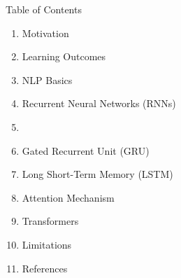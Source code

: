 \begin{frame}[allowframebreaks]{Table of Contents}
\begin{enumerate}
    \item Motivation
    \item Learning Outcomes
    \item NLP Basics
    \item Recurrent Neural Networks (RNNs)
    \item \item Gated Recurrent Unit (GRU)
    \item Long Short-Term Memory (LSTM)
    \item Attention Mechanism
    \item Transformers
    \item Limitations
    \item References
\end{enumerate}
\end{frame}